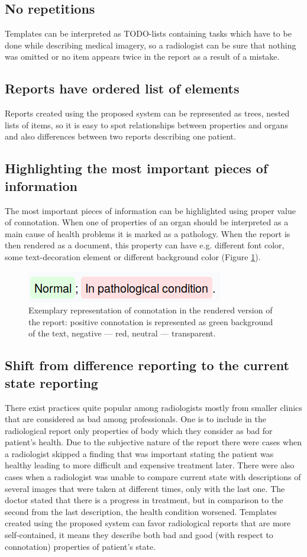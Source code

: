 \documentclass[12pt, twoside, openany]{report}
\theoremstyle{definition}
\begin{document}
\subsection{No repetitions}
Templates can be interpreted as TODO-lists containing tasks which have to be done while describing medical imagery, so a radiologist can be sure that nothing was omitted or no item appears twice in the report as a result of a mistake.
\subsection{Reports have ordered list of elements}
Reports created using the proposed system can be represented as trees, nested lists of items, so it is easy to spot relationships between properties and organs and also differences between two reports describing one patient.
\subsection{Highlighting the most important pieces of information}
The most important pieces of information can be highlighted using proper value of connotation. When one of properties of an organ should be interpreted as a main cause of health problems it is marked as a pathology. When the report is then rendered as a document, this property can have e.g. different font color, some text-decoration element or different background color (Figure \ref{property-connotation-rendered}).

\begin{figure}
	\centering
	\includegraphics[width=0.3\linewidth]{property-connotation-rendered}
	\caption{Exemplary representation of connotation in the rendered version of the report: positive connotation is represented as green background of the text, negative --- red, neutral --- transparent.
		\label{property-connotation-rendered}
	}
\end{figure}
\subsection{Shift from difference reporting to the current state reporting}
There exist practices quite popular among radiologists mostly from smaller clinics that are considered as bad among professionals. One is to include in the radiological report only properties of body which they consider as bad for patient's health. Due to the subjective nature of the report there were cases when a radiologist skipped a finding that was important stating the patient was healthy leading to more difficult and expensive treatment later.
There were also cases when a radiologist was unable to compare current state with descriptions of several images that were taken at different times, only with the last one. The doctor stated that there is a progress in treatment, but in comparison to the second from the last description, the health condition worsened. \cite{risk-management}
Templates created using the proposed system can favor radiological reports that are more self-contained, it means they describe both bad and good (with respect to connotation) properties of patient's state.
\end{document}
